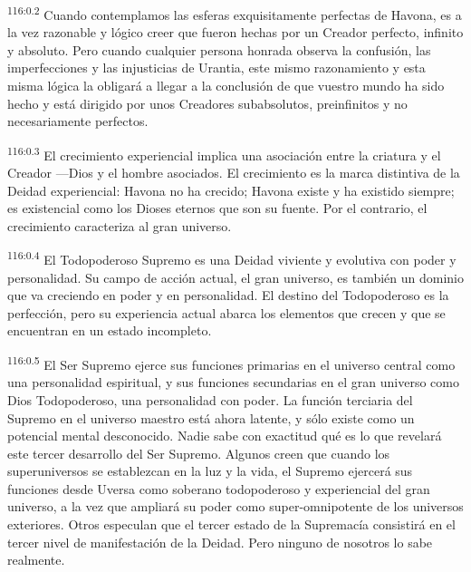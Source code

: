 \documentclass[twoside, 11pt]{book}
\begin{document}
\par
\textsuperscript{116:0.2} Cuando contemplamos las esferas exquisitamente perfectas de Havona, es a la vez razonable y lógico creer que fueron hechas por un Creador perfecto, infinito y absoluto. Pero cuando cualquier persona honrada observa la confusión, las imperfecciones y las injusticias de Urantia, este mismo razonamiento y esta misma lógica la obligará a llegar a la conclusión de que vuestro mundo ha sido hecho y está dirigido por unos Creadores subabsolutos, preinfinitos y no necesariamente perfectos.

\par
\textsuperscript{116:0.3} El crecimiento experiencial implica una asociación entre la criatura y el Creador ---Dios y el hombre asociados. El crecimiento es la marca distintiva de la Deidad experiencial: Havona no ha crecido; Havona existe y ha existido siempre; es existencial como los Dioses eternos que son su fuente. Por el contrario, el crecimiento caracteriza al gran universo.

\par
\textsuperscript{116:0.4} El Todopoderoso Supremo es una Deidad viviente y evolutiva con poder y personalidad. Su campo de acción actual, el gran universo, es también un dominio que va creciendo en poder y en personalidad. El destino del Todopoderoso es la perfección, pero su experiencia actual abarca los elementos que crecen y que se encuentran en un estado incompleto.

\par
\textsuperscript{116:0.5} El Ser Supremo ejerce sus funciones primarias en el universo central como una personalidad espiritual, y sus funciones secundarias en el gran universo como Dios Todopoderoso, una personalidad con poder. La función terciaria del Supremo en el universo maestro está ahora latente, y sólo existe como un potencial mental desconocido. Nadie sabe con exactitud qué es lo que revelará este tercer desarrollo del Ser Supremo. Algunos creen que cuando los superuniversos se establezcan en la luz y la vida, el Supremo ejercerá sus funciones desde Uversa como soberano todopoderoso y experiencial del gran universo, a la vez que ampliará su poder como super-omnipotente de los universos exteriores. Otros especulan que el tercer estado de la Supremacía consistirá en el tercer nivel de manifestación de la Deidad. Pero ninguno de nosotros lo sabe realmente.
\end{document}

